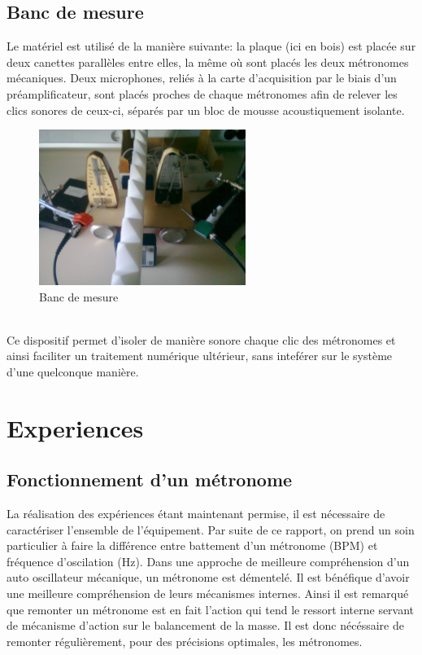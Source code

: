 \documentclass[a4paper,11pt]{report}
\begin{document}
\section{Banc de mesure}

Le matériel est utilisé de la manière suivante: la plaque (ici en bois) est placée sur deux canettes parallèles entre elles, la même où sont placés les deux métronomes mécaniques. Deux microphones, reliés à la carte d'acquisition par le biais d'un préamplificateur, sont placés proches de chaque métronomes afin de relever les clics sonores de ceux-ci, séparés par un bloc de mousse acoustiquement isolante.\\
\begin{figure}[h]
\centering
\includegraphics[width=0.6\textwidth]{BancMesure}
\caption{Banc de mesure}\label{Banc}
\end{figure}\\
Ce dispositif permet d'isoler de manière sonore chaque clic des métronomes et ainsi faciliter un traitement numérique ultérieur, sans inteférer sur le système d'une quelconque manière.
\chapter{Experiences}
\section{Fonctionnement d'un métronome}
La réalisation des expériences étant maintenant permise, il est nécessaire de caractériser  l'ensemble de l'équipement. Par suite de ce rapport, on prend un soin particulier à faire la différence entre battement d'un métronome (BPM) et fréquence d'oscilation (Hz). Dans une approche de meilleure compréhension d'un auto oscillateur mécanique, un métronome est  démentelé. Il est bénéfique d'avoir une meilleure compréhension de leurs mécanismes internes. Ainsi il est remarqué que remonter un métronome est en fait l'action qui tend le ressort interne servant de mécanisme d'action sur le balancement de la masse. Il est donc nécéssaire de remonter régulièrement, pour des précisions optimales, les métronomes. \\
\end{document}
